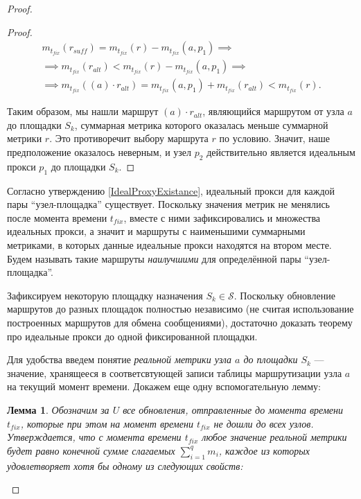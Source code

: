 \documentclass{article}
\theoremstyle{plain}
\theoremstyle{plain}
\theoremstyle{plain}
\newtheorem{lemma}{Лемма}[section]
\theoremstyle{plain}
\theoremstyle{definition}
\theoremstyle{remark}
\theoremstyle{plain}
\begin{document}
\begin{proof}
\begin{proof}
        \begin{equation*}
        \begin{aligned}
            m_{t_{fix}}(r_{suff}) = m_{t_{fix}}(r) - m_{t_{fix}}(a, p_1) \implies \\
            \implies m_{t_{fix}}(r_{alt}) < m_{t_{fix}}(r) - m_{t_{fix}}(a, p_1) \implies \\
            \implies m_{t_{fix}}((a) \cdot r_{alt}) = m_{t_{fix}}(a, p_1) + m_{t_{fix}}(r_{alt}) < m_{t_{fix}}(r).
        \end{aligned}
        \end{equation*}
        
        Таким образом, мы нашли маршрут $(a) \cdot r_{alt}$, являющийся маршрутом от узла $a$ до площадки $S_k$, суммарная метрика которого оказалась меньше суммарной метрики $r$. Это противоречит выбору маршрута $r$ по условию. Значит, наше предположение оказалось неверным, и узел $p_2$ действительно является идеальным прокси $p_1$ до площадки $S_k$.
    \end{proof}
    
    Согласно утверждению \ref{IdealProxyExistance}, идеальный прокси для каждой пары \enquote{узел-площадка} существует. Поскольку значения метрик не менялись после момента времени $t_{fix}$, вместе с ними зафиксировались и множества идеальных прокси, а значит и маршруты с наименьшими суммарными метриками, в которых данные идеальные прокси находятся на втором месте. Будем называть такие маршруты \textit{наилучшими} для определённой пары \enquote{узел-площадка}.
    
    Зафиксируем некоторую площадку назначения $S_k \in \mathcal{S}$. Поскольку обновление маршрутов до разных площадок полностью независимо (не считая использование построенных маршрутов для обмена сообщениями), достаточно доказать теорему про идеальные прокси до одной фиксированной площадки.
    
    Для удобства введем понятие \textit{реальной метрики узла $a$ до площадки $S_k$} --- значение, хранящееся в соответсвтующей записи таблицы маршрутизации узла $a$ на текущий момент времени. Докажем еще одну вспомогательную лемму:
    
    \begin{lemma}
    \label{PossibleMetricValue}
        Обозначим за $U$ все обновления, отправленные до момента времени $t_{fix}$, которые при этом на момент времени $t_{fix}$ не дошли до всех узлов. Утверждается, что с момента времени $t_{fix}$ любое значение реальной метрики будет равно конечной сумме слагаемых $\displaystyle \sum_{i = 1}^q m_i$, каждое из которых удовлетворяет хотя бы одному из следующих свойств:
        

\end{lemma}
\end{proof}
\end{document}

